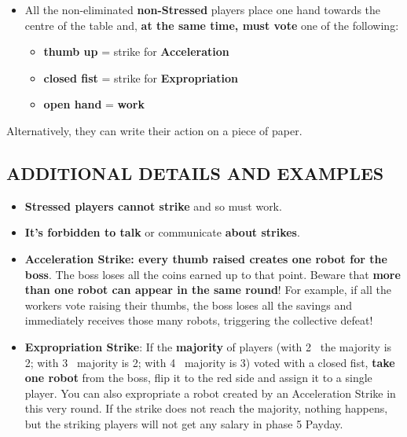         \begin{itemize}
            \item All the non-eliminated \textbf{non-Stressed} players place one hand towards the
            centre of the table and, \textbf{at the same time, must vote} one of the following:
            \begin{itemize}
                \item \textbf{thumb up} = strike for \textbf{Acceleration}
                \item \textbf{closed fist} = strike for \textbf{Expropriation}
                \item \textbf{open hand} = \textbf{work}
            \end{itemize}
        \end{itemize}
Alternatively, they can write their action on a piece of paper.

    
    \subsection{ADDITIONAL DETAILS AND EXAMPLES}

        \begin{itemize}
            \item \textbf{Stressed players cannot strike} and so must work.
            \item \textbf{It's forbidden to talk} or communicate \textbf{about strikes}.
            \item \textbf{Acceleration Strike: every thumb raised creates one robot for the boss}.
            The boss loses all the coins earned up to that point. Beware that \textbf{more than
            one robot can appear in the same round}! For example, if all the workers
            vote raising their thumbs, the boss loses all the savings and immediately
            receives those many robots, triggering the collective defeat!
            \item \textbf{Expropriation Strike}: If the \textbf{majority} of players (with 2 \faPeopleGroup\ the majority is 2;
            with 3 \faPeopleGroup\ majority is 2; with 4 \faPeopleGroup\ majority is 3) voted with a closed fist, \textbf{take
            one robot} from the boss, flip it to the red side and assign it to a single player.
            You can also expropriate a robot created by an Acceleration Strike in this very
            round. If the strike does not reach the majority, nothing happens, but the
            striking players will not get any salary in phase 5 Payday.
        \end{itemize}
    
